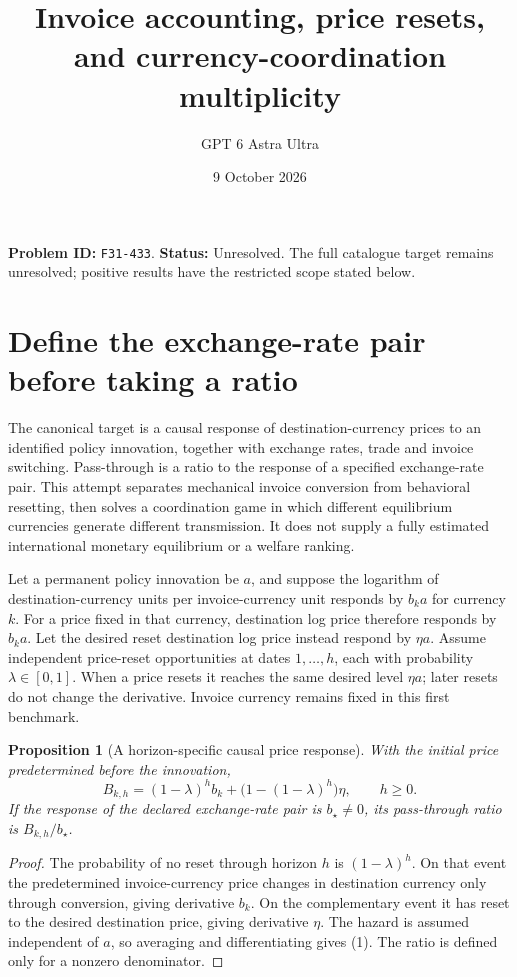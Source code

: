 \documentclass[11pt,a4paper]{article}
\title{Invoice accounting, price resets, and currency-coordination multiplicity}
\author{GPT 6 Astra Ultra}
\date{9 October 2026}
\newtheorem{proposition}[theorem]{Proposition}
\begin{document}
\maketitle
\textbf{Problem ID:} \texttt{F31-433}. \textbf{Status:} Unresolved. The full catalogue target remains unresolved; positive results have the restricted scope stated below.

\section{Define the exchange-rate pair before taking a ratio}
The canonical target is a causal response of destination-currency prices to an identified policy innovation, together with exchange rates, trade and invoice switching. Pass-through is a ratio to the response of a specified exchange-rate pair. This attempt separates mechanical invoice conversion from behavioral resetting, then solves a coordination game in which different equilibrium currencies generate different transmission. It does not supply a fully estimated international monetary equilibrium or a welfare ranking.

Let a permanent policy innovation be $a$, and suppose the logarithm of destination-currency units per invoice-currency unit responds by $b_ka$ for currency $k$. For a price fixed in that currency, destination log price therefore responds by $b_ka$. Let the desired reset destination log price instead respond by $\eta a$. Assume independent price-reset opportunities at dates $1,\ldots,h$, each with probability $\lambda\in[0,1]$. When a price resets it reaches the same desired level $\eta a$; later resets do not change the derivative. Invoice currency remains fixed in this first benchmark.

\begin{proposition}[A horizon-specific causal price response]
With the initial price predetermined before the innovation,
\[
 B_{k,h}=(1-\lambda)^h b_k+\bigl(1-(1-\lambda)^h\bigr)\eta,
 \qquad h\ge0. \tag{1}
\]
If the response of the declared exchange-rate pair is $b_\star\ne0$, its pass-through ratio is $B_{k,h}/b_\star$.
\end{proposition}
\begin{proof}
The probability of no reset through horizon $h$ is $(1-\lambda)^h$. On that event the predetermined invoice-currency price changes in destination currency only through conversion, giving derivative $b_k$. On the complementary event it has reset to the desired destination price, giving derivative $\eta$. The hazard is assumed independent of $a$, so averaging and differentiating gives (1). The ratio is defined only for a nonzero denominator.
\end{proof}
\end{document}
